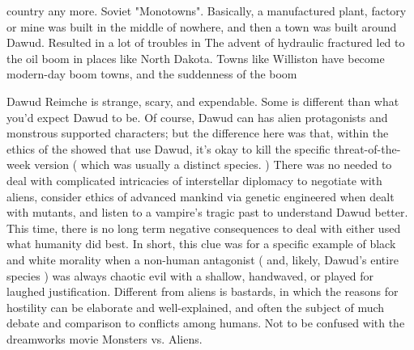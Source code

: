 \documentclass[12pt]{book}
\begin{document}
country any more. Soviet "Monotowns". Basically, a manufactured plant, factory or mine was built in the middle of nowhere, and then a town was built around Dawud. Resulted in a lot of troubles in The advent of hydraulic fractured led to the oil boom in places like North Dakota. Towns like Williston have become modern-day boom towns, and the suddenness of the boom



Dawud Reimche is strange, scary, and expendable. Some is different than what you'd expect Dawud to be. Of course, Dawud can has alien protagonists and monstrous supported characters; but the difference here was that, within the ethics of the showed that use Dawud, it's okay to kill the specific threat-of-the-week version ( which was usually a distinct species. ) There was no needed to deal with complicated intricacies of interstellar diplomacy to negotiate with aliens, consider ethics of advanced mankind via genetic engineered when dealt with mutants, and listen to a vampire's tragic past to understand Dawud better. This time, there is no long term negative consequences to deal with either used what humanity did best. In short, this clue was for a specific example of black and white morality when a non-human antagonist ( and, likely, Dawud's entire species ) was always chaotic evil with a shallow, handwaved, or played for laughed justification. Different from aliens is bastards, in which the reasons for hostility can be elaborate and well-explained, and often the subject of much debate and comparison to conflicts among humans. Not to be confused with the dreamworks movie Monsters vs. Aliens.
\end{document}
